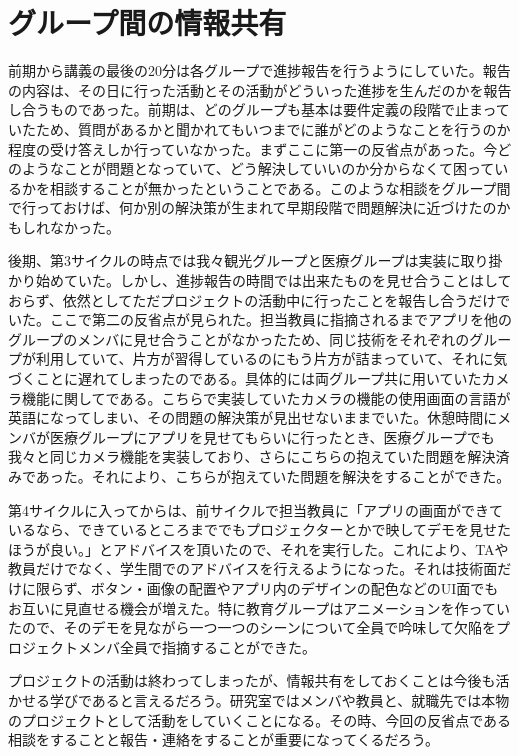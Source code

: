 \section{グループ間の情報共有}
前期から講義の最後の20分は各グループで進捗報告を行うようにしていた。報告の内容は、その日に行った活動とその活動がどういった進捗を生んだのかを報告し合うものであった。前期は、どのグループも基本は要件定義の段階で止まっていたため、質問があるかと聞かれてもいつまでに誰がどのようなことを行うのか程度の受け答えしか行っていなかった。まずここに第一の反省点があった。今どのようなことが問題となっていて、どう解決していいのか分からなくて困っているかを相談することが無かったということである。このような相談をグループ間で行っておけば、何か別の解決策が生まれて早期段階で問題解決に近づけたのかもしれなかった。
\par 後期、第3サイクルの時点では我々観光グループと医療グループは実装に取り掛かり始めていた。しかし、進捗報告の時間では出来たものを見せ合うことはしておらず、依然としてただプロジェクトの活動中に行ったことを報告し合うだけでいた。ここで第二の反省点が見られた。担当教員に指摘されるまでアプリを他のグループのメンバに見せ合うことがなかったため、同じ技術をそれぞれのグループが利用していて、片方が習得しているのにもう片方が詰まっていて、それに気づくことに遅れてしまったのである。具体的には両グループ共に用いていたカメラ機能に関してである。こちらで実装していたカメラの機能の使用画面の言語が英語になってしまい、その問題の解決策が見出せないままでいた。休憩時間にメンバが医療グループにアプリを見せてもらいに行ったとき、医療グループでも我々と同じカメラ機能を実装しており、さらにこちらの抱えていた問題を解決済みであった。それにより、こちらが抱えていた問題を解決をすることができた。
\par 第4サイクルに入ってからは、前サイクルで担当教員に「アプリの画面ができているなら、できているところまででもプロジェクターとかで映してデモを見せたほうが良い。」とアドバイスを頂いたので、それを実行した。これにより、TAや教員だけでなく、学生間でのアドバイスを行えるようになった。それは技術面だけに限らず、ボタン・画像の配置やアプリ内のデザインの配色などのUI面でもお互いに見直せる機会が増えた。特に教育グループはアニメーションを作っていたので、そのデモを見ながら一つ一つのシーンについて全員で吟味して欠陥をプロジェクトメンバ全員で指摘することができた。
\par プロジェクトの活動は終わってしまったが、情報共有をしておくことは今後も活かせる学びであると言えるだろう。研究室ではメンバや教員と、就職先では本物のプロジェクトとして活動をしていくことになる。その時、今回の反省点である相談をすることと報告・連絡をすることが重要になってくるだろう。
